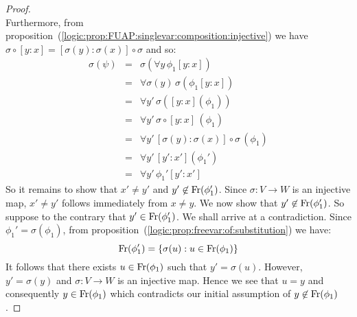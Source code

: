 \begin{proof}
\[    \]
Furthermore, from
proposition~(\ref{logic:prop:FUAP:singlevar:composition:injective})
we have $\sigma\circ[y\!:\!x]=[\sigma(y)\!:\!\sigma(x)]\circ\sigma$
and so:
    \begin{eqnarray*}
    \sigma(\psi)&=&\sigma(\forall y\,\phi_{1}[y\!:\!x])\\
    &=&\forall\sigma(y)\,\sigma(\phi_{1}[y\!:\!x])\\
    &=&\forall y'\,\sigma([y\!:\!x](\phi_{1}))\\
    &=&\forall y'\,\sigma\circ [y\!:\!x]\,(\phi_{1})\\
    &=&\forall y'\, [\sigma(y)\!:\!\sigma(x)]\circ\sigma\,(\phi_{1})\\
    &=&\forall y'\,[y'\!:\!x'](\phi_{1}')\\
    &=&\forall y'\,\phi_{1}'[y'\!:\!x']
    \end{eqnarray*}
So it remains to show that $x'\neq y'$ and
$y'\not\in\mbox{\rm Fr}(\phi_{1}')$. Since $\sigma:V\to W$ is an injective
map, $x'\neq y'$ follows immediately from $x\neq y$. We now show
that $y'\not\in\mbox{\rm Fr}(\phi_{1}')$. So suppose to the contrary that
$y'\in\mbox{\rm Fr}(\phi_{1}')$. We shall arrive at a contradiction. Since
$\phi_{1}'=\sigma(\phi_{1})$, from
proposition~(\ref{logic:prop:freevar:of:substitution}) we have:
 \[ \mbox{\rm Fr}(\phi_{1}')=\{\sigma(u):u\in\mbox{\rm Fr}(\phi_{1})\}
 \]
It follows that there exists $u\in\mbox{\rm Fr}(\phi_{1})$ such that
$y'=\sigma(u)$. However, $y'=\sigma(y)$ and $\sigma:V\to W$ is an
injective map. Hence we see that $u=y$ and consequently
$y\in\mbox{\rm Fr}(\phi_{1})$ which contradicts our initial assumption of
$y\not\in\mbox{\rm Fr}(\phi_{1})$.
\end{proof}

